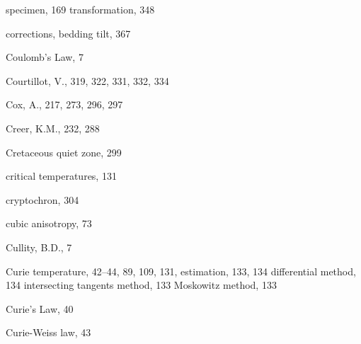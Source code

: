 \documentclass[,plain]{tauxe}
\begin{document}
\begin{theindex}
    \subitem specimen, 169
    \subitem transformation, 348
  \item corrections, bedding tilt, 367
  \item Coulomb's Law, 7
  \item Courtillot, V., 319, 322, 331, 332, 334
  \item Cox, A., 217, 273, 296, 297
  \item Creer, K.M., 232, 288
  \item Cretaceous quiet zone, 299
  \item critical temperatures, 131
  \item cryptochron, 304
  \item cubic anisotropy, 73
  \item Cullity, B.D., 7
  \item Curie temperature, 42--44, 89, 109, 131,
    \subitem estimation, 133, 134
      \subsubitem differential method, 134
      \subsubitem intersecting tangents method, 133
      \subsubitem Moskowitz method, 133
  \item Curie's Law, 40
  \item Curie-Weiss law, 43


\end{theindex}
\end{document}
